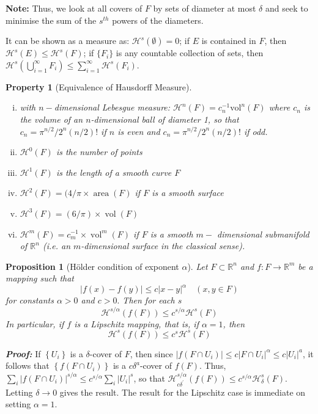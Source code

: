 \documentclass[12pt, a4paper]{article}
\newtheorem{property}{Property}[subsection]
\newtheorem{proposition}{Proposition}[subsection]
\begin{document}
\textbf{Note:}
Thus, we look at all covers of $F$ by sets of diameter at most $\delta$ and seek to minimise the sum of the  $s^{th}$ powers of the diameters.

It can be shown as a measure as: $\mathcal{H}^s(\emptyset) = 0$; if $E$ is contained in $F$, then $\mathcal{H}^s(E)\leq \mathcal{H}^s(F)$; if $\{F_i\}$ is any countable collection of sets, then $\displaystyle \mathcal{H}^{s}\left(\bigcup_{i=1}^{\infty} F_{i}\right) \leq \sum_{i=1}^{\infty} \mathcal{H}^{s}\left(F_{i}\right)$.

\begin{property}[Equivalence of Hausdorff Measure] $ $
    \begin{enumerate}[(i)]
        \item with $n-$dimensional Lebesgue measure: $\mathcal{H}^n(F) = c_n^{-1} \text{vol}^n(F)$ where $c_n$ is the volume of an $n$-dimensional ball of diameter 1, so that $c_{n}=\pi^{n / 2} / 2^{n}(n / 2) !$ if $n$ is even and $c_{n}=\pi^{n / 2} / 2^{n}(n / 2) !$ if odd.
        \item $\mathcal{H}^0(F)$ is the number of points
        \item $\mathcal{H}^1(F)$ is the length of a smooth curve $F$
        \item $\mathcal{H}^2(F) = (4/\pi\times \operatorname{area}(F)$ if $F$ is a smooth surface
        \item $\mathcal{H}^{3}(F)=(6 / \pi) \times \operatorname{vol}(F)$
        \item $\mathcal{H}^{m}(F)=c_{m}^{-1} \times \operatorname{vol}^{m}(F)$ if $F$ is a smooth $m-$
        dimensional submanifold of $\mathbb{R}^{n}$ (i.e. an $m$-dimensional surface in the classical sense).
    \end{enumerate}
\end{property}

\begin{proposition}[Hölder condition of exponent $\alpha$]\label{Haus-holder}
    Let $F \subset \mathbb{R}^{n}$ and $f: F \rightarrow \mathbb{R}^{m}$ be a mapping such that
$$
|f(x)-f(y)| \leq c|x-y|^{\alpha} \quad(x, y \in F)
$$
for constants $\alpha>0$ and $c>0 .$ Then for each $s$
$$
\mathcal{H}^{s / \alpha}(f(F)) \leq c^{s / \alpha} \mathcal{H}^{s}(F)
$$
In particular, if $f$ is a Lipschitz mapping, that is, if $\alpha=1$, then
$$
\mathcal{H}^{s}(f(F)) \leq c^{s} \mathcal{H}^{s}(F)
$$
\end{proposition}

\textbf{\textit{Proof:}} If $\left\{U_{i}\right\}$ is a $\delta$-cover of $F$, 
then since $\left|f\left(F \cap U_{i}\right)\right| \leq c\left|F \cap U_{i}\right|^{\alpha} \leq c\left|U_{i}\right|^{a}$, 
it follows that $\left\{f\left(F \cap U_{i}\right)\right\}$ is a $c \delta^{a}$-cover of $f(F)$. 
Thus, $\displaystyle\sum_{i}\left|f\left(F \cap U_{i}\right)\right|^{s / \alpha} \leq c^{s / \alpha} \sum_{i}\left|U_{i}\right|^{s}$, so that $\mathcal{H}_{c \delta^{\prime}}^{s / \alpha}(f(F)) \leq c^{s / \alpha} \mathcal{H}_{\delta}^{s}(F)$. Letting
$\delta \rightarrow 0$ gives the result. 
The result for the Lipschitz case is immediate on setting $\alpha=1$.
\end{document}
